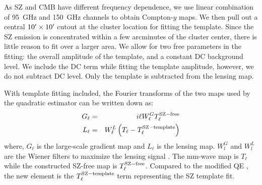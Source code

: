 As SZ and CMB have different frequency dependence, we use linear combination of 95\, GHz and 150\, GHz channels to obtain Compton-$y$ maps.
We then pull out a central $10^{\prime} \times 10^{\prime}$ cutout at the cluster location for fitting the template. 
Since the SZ emission is concentrated within a few arcminutes of the cluster center, there is little reason to fit over a larger area. 
We allow for two free parameters in the fitting: the overall amplitude of the template, and a constant DC background level. 
We include the DC term while fitting the template amplitude, however, we do not subtract DC level. 
Only the template is subtracted from the lensing map.



With template fitting included, the Fourier transforms of the two maps used by the quadratic estimator can be written down as:
\begin{eqnarray}
G_{\ell} &=& i\ell W^{G}_{\ell} T^{\rm SZ-free}_{\ell}\\
L_{\ell} &=& W^{L}_{\ell} \left(T_{\ell} - T_\ell^{\rm SZ-template}\right)
\end{eqnarray}
where, $G_{\ell}$ is the large-scale gradient map and $L_{\ell}$ is the lensing map. 
$W^{G}_{l}$ and $W^{L}_{l} $ are the Wiener filters to maximize the lensing signal \cite{hu07}. 
The mm-wave map is $T_{\ell}$ while the constructed SZ-free map is $T^{\rm SZ-free}_{\ell}$. 
Compared to the modified QE \citep{madhavacheril18,raghunathan18}, the new element is the $T_\ell^{\rm SZ-template}$ term representing the SZ template fit. 





